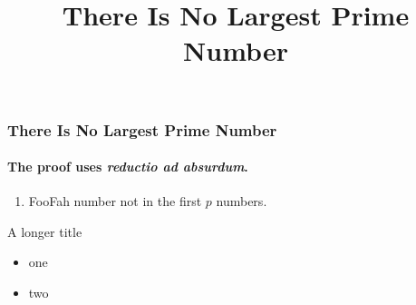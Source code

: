 \documentclass{beamer}
\title{There Is No Largest Prime Number}
\begin{document}


\begin{frame} 
\frametitle{There Is No Largest Prime Number} 
\framesubtitle{The proof uses \textit{reductio ad absurdum}.} 
\begin{enumerate} 
\item FooFah
number not in the first $p$ numbers.
\end{enumerate}
\end{frame}

\begin{frame}{A longer title}
\begin{itemize}
\item one
\item two
\end{itemize}
\end{frame}
\end{document}
